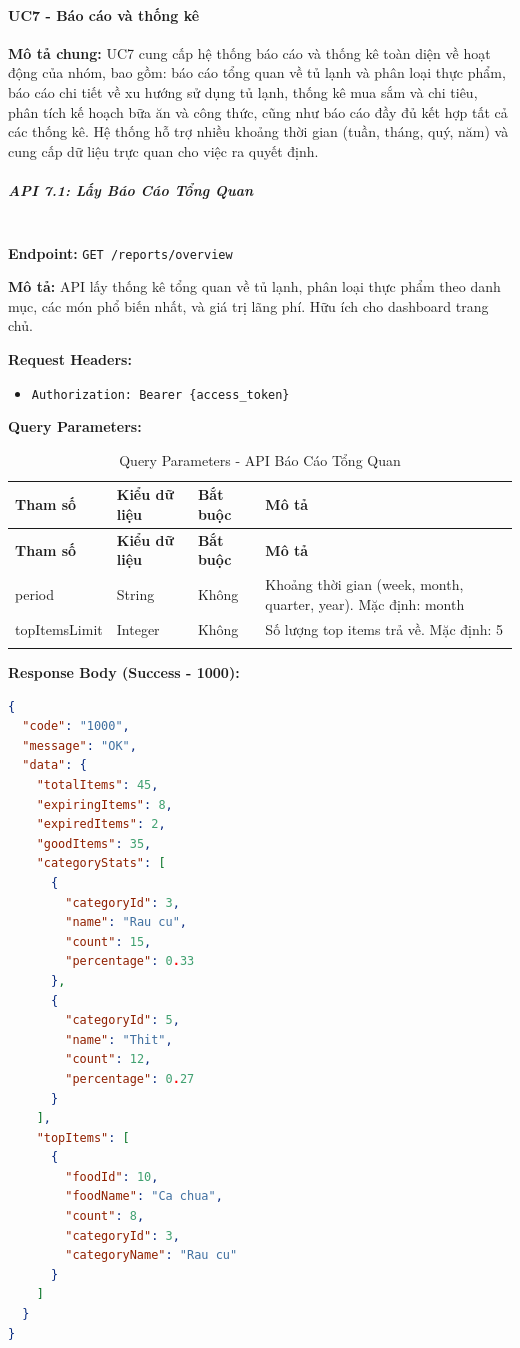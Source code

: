 \paragraph{UC7 - Báo cáo và thống kê}

\textbf{Mô tả chung:} UC7 cung cấp hệ thống báo cáo và thống kê toàn diện về hoạt động của nhóm, bao gồm: báo cáo tổng quan về tủ lạnh và phân loại thực phẩm, báo cáo chi tiết về xu hướng sử dụng tủ lạnh, thống kê mua sắm và chi tiêu, phân tích kế hoạch bữa ăn và công thức, cũng như báo cáo đầy đủ kết hợp tất cả các thống kê. Hệ thống hỗ trợ nhiều khoảng thời gian (tuần, tháng, quý, năm) và cung cấp dữ liệu trực quan cho việc ra quyết định.

\subparagraph{API 7.1: Lấy Báo Cáo Tổng Quan}~\\

\textbf{Endpoint:} \texttt{GET /reports/overview}

\textbf{Mô tả:} API lấy thống kê tổng quan về tủ lạnh, phân loại thực phẩm theo danh mục, các món phổ biến nhất, và giá trị lãng phí. Hữu ích cho dashboard trang chủ.

\textbf{Request Headers:}
\begin{itemize}
    \item \texttt{Authorization: Bearer \{access\_token\}}
\end{itemize}

\textbf{Query Parameters:}

\small
\begin{longtable}{|>{\raggedright\arraybackslash}p{3.5cm}|>{\raggedright\arraybackslash}p{2.5cm}|>{\raggedright\arraybackslash}p{2cm}|>{\raggedright\arraybackslash}p{5.5cm}|}
\hline
\textbf{Tham số} & \textbf{Kiểu dữ liệu} & \textbf{Bắt buộc} & \textbf{Mô tả} \\
\hline
\endfirsthead
\hline
\textbf{Tham số} & \textbf{Kiểu dữ liệu} & \textbf{Bắt buộc} & \textbf{Mô tả} \\
\hline
\endhead
period & String & Không & Khoảng thời gian (week, month, quarter, year). Mặc định: month \\
\hline
topItemsLimit & Integer & Không & Số lượng top items trả về. Mặc định: 5 \\
\hline
\caption{Query Parameters - API Báo Cáo Tổng Quan}
\end{longtable}

\textbf{Response Body (Success - 1000):}

\begin{lstlisting}[language=json, caption=Response thanh cong API 7.1]
{
  "code": "1000",
  "message": "OK",
  "data": {
    "totalItems": 45,
    "expiringItems": 8,
    "expiredItems": 2,
    "goodItems": 35,
    "categoryStats": [
      {
        "categoryId": 3,
        "name": "Rau cu",
        "count": 15,
        "percentage": 0.33
      },
      {
        "categoryId": 5,
        "name": "Thit",
        "count": 12,
        "percentage": 0.27
      }
    ],
    "topItems": [
      {
        "foodId": 10,
        "foodName": "Ca chua",
        "count": 8,
        "categoryId": 3,
        "categoryName": "Rau cu"
      }
    ]
  }
}
\end{lstlisting}

